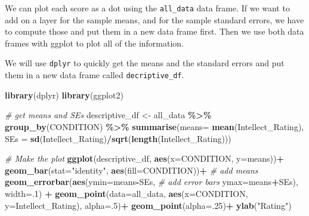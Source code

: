 \documentclass[
]{book}
\newenvironment{Shaded}{\begin{snugshade}}{\end{snugshade}}
\newcommand{\AttributeTok}[1]{\textcolor[rgb]{0.13,0.29,0.53}{#1}}
\newcommand{\CommentTok}[1]{\textcolor[rgb]{0.56,0.35,0.01}{\textit{#1}}}
\newcommand{\DecValTok}[1]{\textcolor[rgb]{0.00,0.00,0.81}{#1}}
\newcommand{\FunctionTok}[1]{\textcolor[rgb]{0.13,0.29,0.53}{\textbf{#1}}}
\newcommand{\NormalTok}[1]{#1}
\newcommand{\OtherTok}[1]{\textcolor[rgb]{0.56,0.35,0.01}{#1}}
\newcommand{\SpecialCharTok}[1]{\textcolor[rgb]{0.81,0.36,0.00}{\textbf{#1}}}
\newcommand{\StringTok}[1]{\textcolor[rgb]{0.31,0.60,0.02}{#1}}
\begin{document}
We can plot each score as a dot using the \texttt{all\_data} data frame. If we want to add on a layer for the sample means, and for the sample standard errors, we have to compute those and put them in a new data frame first. Then we use both data frames with ggplot to plot all of the information.

We will use \texttt{dplyr} to quickly get the means and the standard errors and put them in a new data frame called \texttt{decriptive\_df}.

\begin{Shaded}
\begin{Highlighting}[]
\FunctionTok{library}\NormalTok{(dplyr)}
\FunctionTok{library}\NormalTok{(ggplot2)}

\CommentTok{\# get means and SEs}
\NormalTok{descriptive\_df }\OtherTok{\textless{}{-}}\NormalTok{ all\_data }\SpecialCharTok{\%\textgreater{}\%} 
                    \FunctionTok{group\_by}\NormalTok{(CONDITION) }\SpecialCharTok{\%\textgreater{}\%} 
                    \FunctionTok{summarise}\NormalTok{(}\AttributeTok{means=} \FunctionTok{mean}\NormalTok{(Intellect\_Rating),}
                              \AttributeTok{SEs =} \FunctionTok{sd}\NormalTok{(Intellect\_Rating)}\SpecialCharTok{/}\FunctionTok{sqrt}\NormalTok{(}\FunctionTok{length}\NormalTok{(Intellect\_Rating)))}

\CommentTok{\# Make the plot}
\FunctionTok{ggplot}\NormalTok{(descriptive\_df, }\FunctionTok{aes}\NormalTok{(}\AttributeTok{x=}\NormalTok{CONDITION, }\AttributeTok{y=}\NormalTok{means))}\SpecialCharTok{+} 
  \FunctionTok{geom\_bar}\NormalTok{(}\AttributeTok{stat=}\StringTok{"identity"}\NormalTok{, }\FunctionTok{aes}\NormalTok{(}\AttributeTok{fill=}\NormalTok{CONDITION))}\SpecialCharTok{+} \CommentTok{\# add means}
  \FunctionTok{geom\_errorbar}\NormalTok{(}\FunctionTok{aes}\NormalTok{(}\AttributeTok{ymin=}\NormalTok{means}\SpecialCharTok{{-}}\NormalTok{SEs,               }\CommentTok{\# add error bars}
                    \AttributeTok{ymax=}\NormalTok{means}\SpecialCharTok{+}\NormalTok{SEs), }\AttributeTok{width=}\NormalTok{.}\DecValTok{1}\NormalTok{) }\SpecialCharTok{+}
  \FunctionTok{geom\_point}\NormalTok{(}\AttributeTok{data=}\NormalTok{all\_data, }\FunctionTok{aes}\NormalTok{(}\AttributeTok{x=}\NormalTok{CONDITION, }\AttributeTok{y=}\NormalTok{Intellect\_Rating), }\AttributeTok{alpha=}\NormalTok{.}\DecValTok{5}\NormalTok{)}\SpecialCharTok{+}
  \FunctionTok{geom\_point}\NormalTok{(}\AttributeTok{alpha=}\NormalTok{.}\DecValTok{25}\NormalTok{)}\SpecialCharTok{+}
  \FunctionTok{ylab}\NormalTok{(}\StringTok{"Rating"}\NormalTok{)}
\end{Highlighting}
\end{Shaded}
\end{document}
